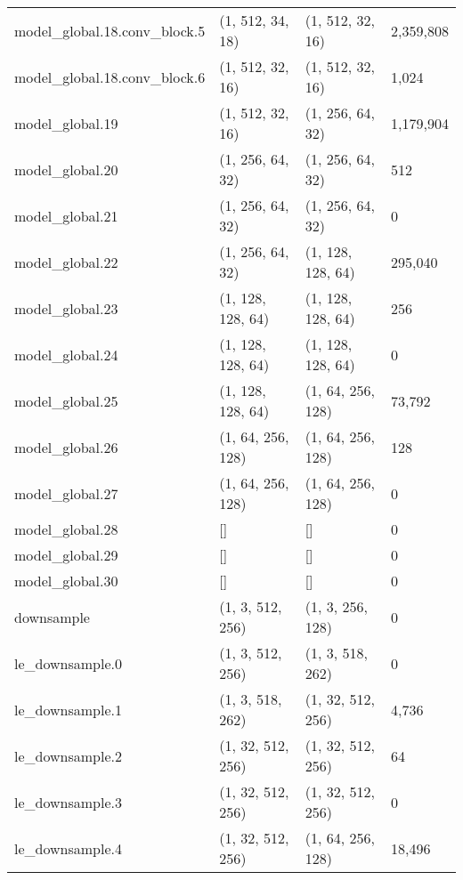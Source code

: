 \begin{longtable}{llll}
        model\_global.18.conv\_block.5 &   (1, 512, 34, 18) &   (1, 512, 32, 16) &   2,359,808 \\
        model\_global.18.conv\_block.6 &   (1, 512, 32, 16) &   (1, 512, 32, 16) &       1,024 \\
                    model\_global.19 &   (1, 512, 32, 16) &   (1, 256, 64, 32) &   1,179,904 \\
                    model\_global.20 &   (1, 256, 64, 32) &   (1, 256, 64, 32) &         512 \\
                    model\_global.21 &   (1, 256, 64, 32) &   (1, 256, 64, 32) &           0 \\
                    model\_global.22 &   (1, 256, 64, 32) &  (1, 128, 128, 64) &     295,040 \\
                    model\_global.23 &  (1, 128, 128, 64) &  (1, 128, 128, 64) &         256 \\
                    model\_global.24 &  (1, 128, 128, 64) &  (1, 128, 128, 64) &           0 \\
                    model\_global.25 &  (1, 128, 128, 64) &  (1, 64, 256, 128) &      73,792 \\
                    model\_global.26 &  (1, 64, 256, 128) &  (1, 64, 256, 128) &         128 \\
                    model\_global.27 &  (1, 64, 256, 128) &  (1, 64, 256, 128) &           0 \\
                    model\_global.28 &                 [] &                 [] &           0 \\
                    model\_global.29 &                 [] &                 [] &           0 \\
                    model\_global.30 &                 [] &                 [] &           0 \\
                        downsample &   (1, 3, 512, 256) &   (1, 3, 256, 128) &           0 \\
                    le\_downsample.0 &   (1, 3, 512, 256) &   (1, 3, 518, 262) &           0 \\
                    le\_downsample.1 &   (1, 3, 518, 262) &  (1, 32, 512, 256) &       4,736 \\
                    le\_downsample.2 &  (1, 32, 512, 256) &  (1, 32, 512, 256) &          64 \\
                    le\_downsample.3 &  (1, 32, 512, 256) &  (1, 32, 512, 256) &           0 \\
                    le\_downsample.4 &  (1, 32, 512, 256) &  (1, 64, 256, 128) &      18,496 \\

\end{longtable}
